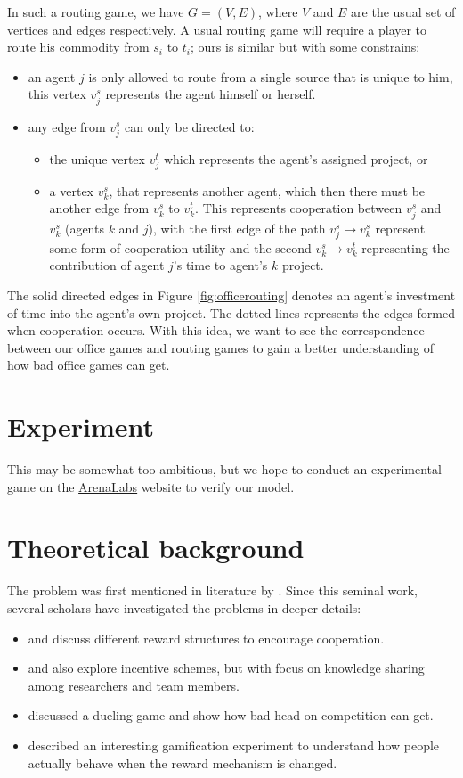 \documentclass[10pt, a4paper]{article}
\begin{document}
	In such a routing game, we have $G=(V,E)$, where $V$ and $E$ are the usual set of vertices and edges respectively. A usual routing game will require a player to route his commodity from $s_i$ to $t_i$; ours is similar but with some constrains:
	\begin{itemize}
	\item an agent $j$ is only allowed to route from a single source that is unique to him, this vertex $v^s_j$ represents the agent himself or herself.
	\item any edge from $v^s_j$ can only be directed to:
	\begin{itemize}
	\item	 the unique vertex $v^t_j$ which represents the agent's assigned project, or
	\item a vertex $v^s_k$, that represents another agent, which then there must be another edge from $v^s_k$ to $v^t_k$. This represents cooperation between $v^s_j$ and $v^s_k$ (agents $k$ and $j$), with the first edge of the path $v^s_j\to v^s_k$ represent some form of cooperation utility and the second $v^s_k\to v^t_k$ representing the contribution of agent $j$'s time to agent's $k$ project.
	\end{itemize}
	\end{itemize}
	The solid directed edges in Figure \ref{fig:officerouting} denotes an agent's investment of time into the agent's own project. The dotted lines represents the edges formed when cooperation occurs. With this idea, we want to see the correspondence between our office games and routing games to gain a better understanding of how bad office games can get.
	\section{Experiment} 
	This may be somewhat too ambitious, but we hope to conduct an experimental game on the \href{http://arenalabs.co/}{ArenaLabs} website to verify our model.
	
	\section{Theoretical background}
	The problem was first mentioned in literature by \cite{Drago1991}. Since this seminal work, several scholars have investigated the problems in deeper details:
	\begin{itemize}
		\item \cite{Drago1998} and \cite{Kistruck2016} discuss different reward structures to encourage cooperation.
		\item \cite{Banerjee2014} and \cite{Chakravarti2015} also explore incentive schemes, but with focus on knowledge sharing among researchers and team members.
		\item \cite{Immorlica2011} discussed a dueling game and show how bad head-on competition can get.
		\item \cite{Landers2015} described an interesting gamification experiment to understand how people actually behave when the reward mechanism is changed.		
	\end{itemize}
	\newpage
	
	
\end{document}
